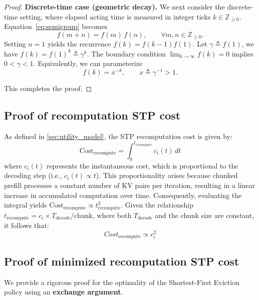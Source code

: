 \begin{proof}
\smallskip
\noindent \textbf{Discrete-time case (geometric decay).} We next consider the discrete-time setting, where elapsed acting time is
measured in integer ticks $k\in\mathbb{Z}_{\ge 0}$.
Equation~\ref{eq:semigroup} becomes
\begin{equation}
f(m+n)=f(m)\,f(n),\qquad \forall m,n\in\mathbb{Z}_{\ge 0}.
\label{eq:semigroup_discrete}
\end{equation}
Setting $n=1$ yields the recurrence $f(k)=f(k-1)f(1)$. Let $\gamma \triangleq f(1)$, we have
$f(k)=f(1)^k\triangleq \gamma^k$.
The boundary condition $\lim_{k\to\infty} f(k)=0$ implies $0<\gamma<1$.
Equivalently, we can parameterize
\begin{equation}
f(k)=x^{-k},\qquad x\triangleq \gamma^{-1}>1.
\label{eq:geom_decay}
\end{equation}

\noindent This completes the proof.
\end{proof}

\subsection{Proof of recomputation STP cost}
\label{app:prefill_stpcost}
As defined in \autoref{sec:utility_model}, the STP recomputation cost is given by:
\begin{equation}
    \text{Cost}_{\text{recompute}} = \int_{0}^{t_{recompute}} c_i(t) \, dt
\end{equation}
where $c_i(t)$ represents the instantaneous cost, which is proportional to the decoding step (i.e., $c_i(t) \propto t$). This proportionality arises because chunked prefill processes a constant number of KV pairs per iteration, resulting in a linear increase in accumulated computation over time. Consequently, evaluating the integral yields $\text{Cost}_{\text{recompute}} \propto t_{\text{recompute}}^2$. Given the relationship $t_{\text{recompute}} = c_i \times T_{\text{decode}} / \text{chunk}$, where both $T_{\text{decode}}$ and the chunk size are constant, it follows that:
\begin{equation*}
Cost_{\text{recompute}} \propto c_{i}^2
\end{equation*}

\subsection{Proof of minimized recomputation STP cost}

\label{app:_minimized_STP_cost}
We provide a rigorous proof for the optimality of the Shortest-First Eviction policy using an \textbf{exchange argument}.

